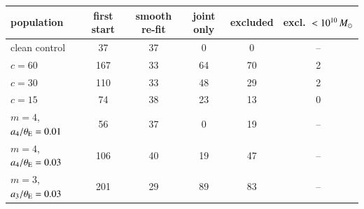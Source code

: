 \begin{tabular}{lccccc}
\toprule
population & first start & smooth re-fit & joint only & excluded & excl.\ $<10^{10}\,M_\odot$ \\
\midrule
clean control & 37 & 37 & 0 & 0 & -- \\
$c=60$ & 167 & 33 & 64 & 70 & 2 \\
$c=30$ & 110 & 33 & 48 & 29 & 2 \\
$c=15$ & 74 & 38 & 23 & 13 & 0 \\
$m=4$, $a_4/\theta_{\rm E}=0.01$ & 56 & 37 & 0 & 19 & -- \\
$m=4$, $a_4/\theta_{\rm E}=0.03$ & 106 & 40 & 19 & 47 & -- \\
$m=3$, $a_3/\theta_{\rm E}=0.03$ & 201 & 29 & 89 & 83 & -- \\
\bottomrule
\end{tabular}
